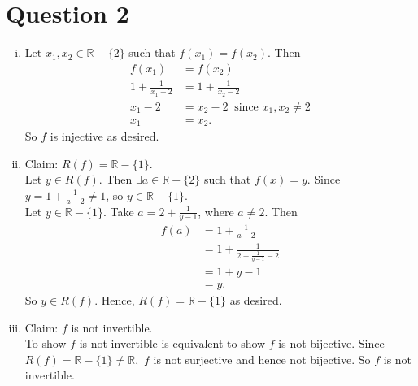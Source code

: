 \documentclass[11pt]{article}
\begin{document}
\section*{Question 2}
\begin{enumerate}[(i)]
    \item 
    Let $x_1,x_2 \in \mathbb{R}-\{2\}$ such that $f(x_1)=f(x_2).$ Then 
    \begin{align*}
        f(x_1)&=f(x_2)\\
        1+\frac{1}{x_1-2}&=1+\frac{1}{x_2-2}\\
        x_1-2&=x_2-2 \ \text{ since }x_1,x_2 \neq 2\\
        x_1&=x_2.
    \end{align*}
    So $f$ is injective as desired.
    \item
    Claim: $R(f)=\mathbb{R}-\{1\}$.\\
    Let $y\in R(f)$. Then $\exists a\in \mathbb{R}-\{2\}$ such that $f(x)=y$. Since $y=1+\frac{1}{a-2}\neq 1$, so $y\in \mathbb{R}-\{1\}.$ \\
    Let $y\in \mathbb{R}-\{1\}$. Take $a=2+\frac{1}{y-1}$, where $a\neq 2$. Then 
    \begin{align*}\nonumber 
        f(a)&=1+\frac{1}{a-2}\\
        &=1+\frac{1}{2+\frac{1}{y-1}-2}\\
        &=1+y-1\\
        &=y.
    \end{align*}
    So $y\in R(f).$ Hence, $R(f)=\mathbb{R}-\{1\}$ as desired.
    \item
    Claim: $f$ is not invertible.\\
    To show $f$ is not invertible is equivalent to show $f$ is not bijective. Since $R(f)=\mathbb{R}-\{1\}\neq \mathbb{R},$ $f$ is not surjective and hence not bijective. So $f$ is not invertible. \\
\end{enumerate}
\end{document}
